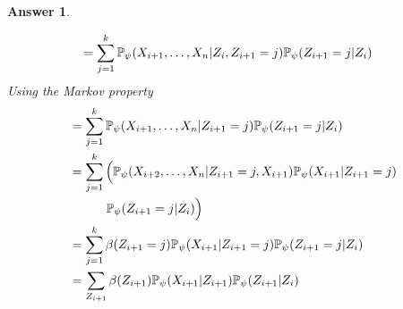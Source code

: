 \documentclass[12pt]{article}
\theoremstyle{colon}
\newtheorem*{answer}{Answer}
\begin{document}
\begin{answer}
\begin{enumerate}[label=\arabic*)]
\begin{align*}
        &= \sum_{j=1}^k \mathbb{P}_{\psi}(X_{i+1}, \mathellipsis, X_n | Z_i, Z_{i+1} = j) \mathbb{P}_{\psi}(Z_{i+1} = j | Z_i)
      \end{align*}
      Using the Markov property
      \begin{align*}
        &= \sum_{j=1}^k \mathbb{P}_{\psi}(X_{i+1}, \mathellipsis, X_n | Z_{i+1} = j) \mathbb{P}_{\psi}(Z_{i+1} = j | Z_i) \\
        &= \sum_{j=1}^k \Big( \mathbb{P}_{\psi}(X_{i+2}, \mathellipsis, X_n | Z_{i+1} = j, X_{i+1}) \mathbb{P}_{\psi}(X_{i+1} | Z_{i+1} = j) \\
        &\quad\quad\quad \mathbb{P}_{\psi}(Z_{i+1} = j | Z_i) \Big) \\
        &= \sum_{j=1}^k \beta(Z_{i+1} = j) \mathbb{P}_{\psi}(X_{i+1} | Z_{i+1} = j) \mathbb{P}_{\psi}(Z_{i+1} = j | Z_i) \\
        &= \sum_{Z_{i+1}} \beta(Z_{i+1}) \mathbb{P}_{\psi}(X_{i+1} | Z_{i+1}) \mathbb{P}_{\psi}(Z_{i+1} | Z_i)
      \end{align*}
  \end{enumerate}
\end{answer}

\clearpage
\end{document}

